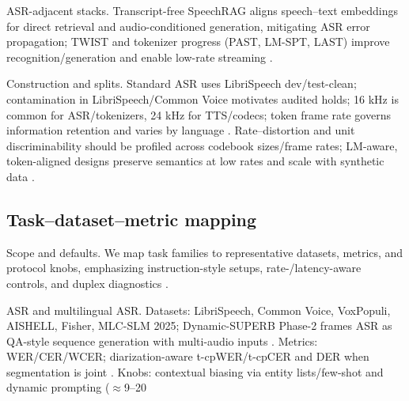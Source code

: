 \documentclass{article}
\begin{document}
ASR-adjacent stacks. Transcript-free SpeechRAG aligns speech--text embeddings for direct retrieval and audio-conditioned generation, mitigating ASR error propagation; TWIST and tokenizer progress (PAST, LM-SPT, LAST) improve recognition/generation and enable low-rate streaming \cite{min2025speechretrievalaugmentedgenerationwithou,hassid2024textuallypretrainedspeechlanguagemodels,har-tuv2025pastphoneticacousticspeechtokenizer,jo2025lmsptalignedsemanticdistillationspeechto,turetzky2024lastlanguagemodelawarespeechtokenization}.

Construction and splits. Standard ASR uses LibriSpeech dev/test-clean; contamination in LibriSpeech/Common Voice motivates audited holds; 16 kHz is common for ASR/tokenizers, 24 kHz for TTS/codecs; token frame rate governs information retention and varies by language \cite{tseng2025evaluationllmsspeechisoftenflawedtestset,zhang2025impactframeratesspeechtokenizercasestudy,li2024investigatingneuralaudiocodecsspeechlang,ye2024codecdoesmatterexploringsemanticshortcom,li2024effectivenessacousticbpedecoderonlytts}. Rate--distortion and unit discriminability should be profiled across codebook sizes/frame rates; LM-aware, token-aligned designs preserve semantics at low rates and scale with synthetic data \cite{turetzky2024lastlanguagemodelawarespeechtokenization,maimon2025scalinganalysisinterleavedspeechtextlang,zeng2024scalingspeechtextpretrainingsyntheticint,hassid2024textuallypretrainedspeechlanguagemodels,guo2025fastlongspeechenhancinglargespeechlangua}.

\subsection{Task--dataset--metric mapping} \label{subsec:Task--dataset--metric mapping}

Scope and defaults. We map task families to representative datasets, metrics, and protocol knobs, emphasizing instruction-style setups, rate-/latency-aware controls, and duplex diagnostics \cite{vashishth2024stabspeechtokenizerassessmentbenchmark,entry2025indicsuperbspeechprocessinguniversalperf}.

ASR and multilingual ASR. Datasets: LibriSpeech, Common Voice, VoxPopuli, AISHELL, Fisher, MLC-SLM 2025; Dynamic-SUPERB Phase-2 frames ASR as QA-style sequence generation with multi-audio inputs \cite{huang2025dynamicsuperbphase2collaborativelyexpand,li2025seewossubmissionmlcslmlessonslearnedspee}. Metrics: WER/CER/WCER; diarization-aware t-cpWER/t-cpCER and DER when segmentation is joint \cite{kando2025exploringeffectsegmentationvocabularysiz}. Knobs: contextual biasing via entity lists/few-shot and dynamic prompting ($\approx$9--20%
\end{document}
